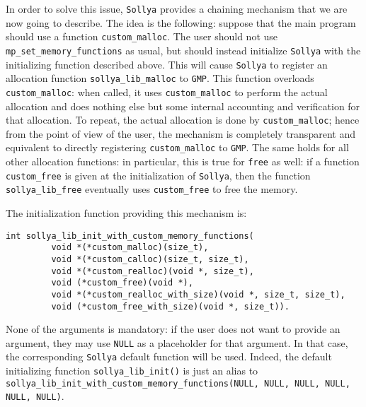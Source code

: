 \documentclass[a4paper]{article}
\newcommand{\sollya}{\texttt{Sollya}\xspace}
\begin{document}
In order to solve this issue, \sollya provides a chaining mechanism that we are now going to describe. The idea is the following: suppose that the main program should use a function \verb|custom_malloc|. The user should not use \verb|mp_set_memory_functions| as usual, but should instead initialize \sollya with the initializing function described above. This will cause \sollya to register an allocation function \verb|sollya_lib_malloc| to \verb|GMP|. This function overloads \verb|custom_malloc|: when called, it uses \verb|custom_malloc| to perform the actual allocation and does nothing else but some internal accounting and verification for that allocation. To repeat, the actual allocation is done by \verb|custom_malloc|; hence from the point of view of the user, the mechanism is completely transparent and equivalent to directly registering \verb|custom_malloc| to \verb|GMP|. The same holds for all other allocation functions: in particular, this is true for \verb|free| as well: if a function \verb|custom_free| is given at the initialization of \sollya, then the function \verb|sollya_lib_free| eventually uses \verb|custom_free| to free the memory. 

The initialization function providing this mechanism is:
\begin{center}
\verb|int sollya_lib_init_with_custom_memory_functions(                   |\\
\verb|         void *(*custom_malloc)(size_t),                            |\\
\verb|         void *(*custom_calloc)(size_t, size_t),                    |\\
\verb|         void *(*custom_realloc)(void *, size_t),                   |\\
\verb|         void (*custom_free)(void *),                               |\\
\verb|         void *(*custom_realloc_with_size)(void *, size_t, size_t),|\\
\verb|         void (*custom_free_with_size)(void *, size_t)).            |
\end{center}
None of the arguments is mandatory: if the user does not want to provide an argument, they may use \verb|NULL| as a placeholder for that argument. In that case, the corresponding \sollya default function will be used. Indeed, the default initializing function \verb|sollya_lib_init()| is just an alias to \verb|sollya_lib_init_with_custom_memory_functions(NULL, NULL, NULL, NULL, NULL, NULL)|.
\end{document}
